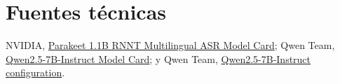 \section{Fuentes técnicas}

{\small NVIDIA,
\href{https://build.nvidia.com/nvidia/parakeet-1_1b-rnnt-multilingual-asr/modelcard}{Parakeet 1.1B RNNT Multilingual ASR Model Card};
Qwen Team,
\href{https://huggingface.co/Qwen/Qwen2.5-7B-Instruct}{Qwen2.5-7B-Instruct Model Card};
y Qwen Team,
\href{https://huggingface.co/Qwen/Qwen2.5-7B-Instruct/raw/main/config.json}{Qwen2.5-7B-Instruct configuration}.}
